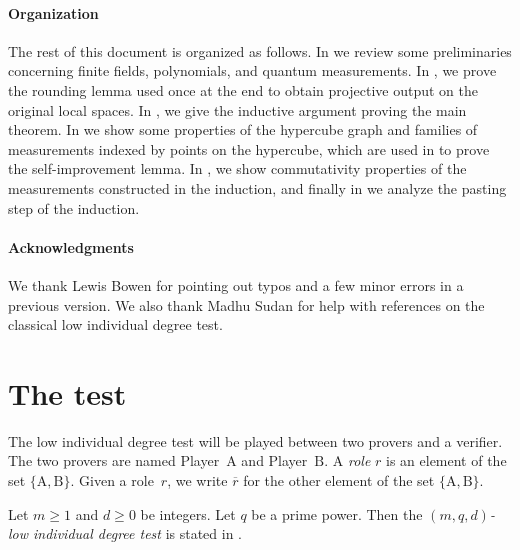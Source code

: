 \documentclass[11pt]{article}
\theoremstyle{definition}
\begin{document}
\paragraph{Organization}
The rest of this document is organized as follows. In
 we review some preliminaries concerning finite
fields, polynomials, and quantum measurements. In
, we prove the rounding
lemma used once at the end to obtain projective output on the original
local spaces. In , we give the inductive argument
proving the main theorem. In  we show
some properties of the hypercube graph and families of measurements
indexed by points on the hypercube, which are used in
 to prove the self-improvement lemma. In
, we show commutativity
properties of the measurements constructed in the induction, and
finally in  we analyze the pasting step of the induction.

\paragraph{Acknowledgments}

We thank Lewis Bowen for pointing out typos and a few minor errors in a previous version.
We also thank Madhu Sudan for help with references on the classical low individual degree test.

\section{The test}\label{sec:the-test}

\begin{definition}[Roles]
The low individual degree test will be played between two provers and a verifier.
The two provers are named Player~$\mathrm{A}$ and Player~$\mathrm{B}$.
A \emph{role} $r$ is an element of the set $\{\mathrm{A}, \mathrm{B}\}$.
Given a role~$r$, we write $\overline{r}$ for the other element of the set $\{\mathrm{A}, \mathrm{B}\}$.
\end{definition}

\begin{definition}
Let $m\geq1$ and $d\geq0$ be integers.
Let $q$ be a prime power.
Then the \emph{$(m,q,d)$-low individual degree test}
is stated in .
\end{definition}
\end{document}
